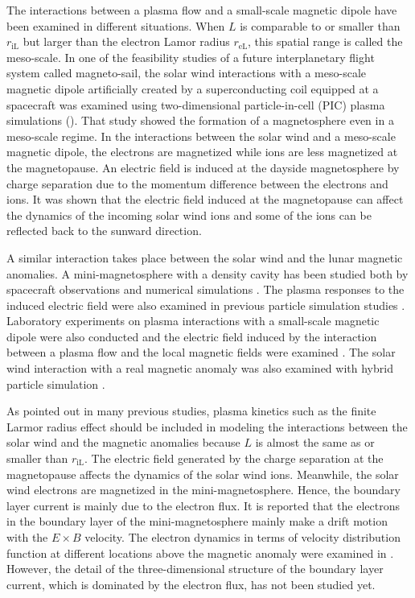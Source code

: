 \documentclass[draft,jgrga]{agutex2015}
\begin{document}
\begin{article}
The interactions between a plasma flow and a small-scale magnetic dipole 
have been examined in different situations.
When $L$ is comparable to or smaller than $r_\mathrm{iL}$
but larger than the electron Lamor radius $r_\mathrm{eL}$,
this spatial range is called the meso-scale.
In one of the feasibility studies of a future interplanetary flight system called magneto-sail,
the solar wind interactions with a meso-scale magnetic dipole artificially created by a
superconducting coil equipped at a spacecraft was examined using two-dimensional
particle-in-cell (PIC) plasma simulations (\cite{Moritaka2012}).
That study showed the formation of a magnetosphere even in a meso-scale regime.
In the interactions between the solar wind and a meso-scale magnetic dipole,
the electrons are magnetized while ions are less magnetized at the magnetopause.
An electric field is induced at the dayside magnetosphere by charge separation
due to the momentum difference between the electrons and ions.
It was shown that the electric field induced at the magnetopause
can affect the dynamics of the incoming solar wind ions and some of the ions can be reflected
back to the sunward direction.

A similar interaction takes place between the solar wind and the lunar magnetic anomalies.
A mini-magnetosphere with a density cavity has been studied both by
 spacecraft observations and numerical simulations
\citep[e.g.][]{Harnett2000,Harnett2003,Halekas2008b,Bamford2012}.
The plasma responses to the induced electric field were also examined
in  previous particle simulation studies
\citep[e.g.][]{Harnett2002,Kallio2012,Poppe2012a,Deca2014,Deca2015}.
Laboratory experiments on plasma interactions
with a small-scale magnetic dipole
were also conducted and the electric field 
induced by the interaction
between a plasma flow and the local magnetic fields were examined
\citep[e.g.][]{Howes2015,Jarvinen2014,Wang2013,Bamford2012}.
The solar wind interaction with a real magnetic anomaly was also 
examined with hybrid particle simulation 
\citep{Fatemi2015}.


As pointed out in many previous studies,
plasma kinetics such as the  finite Larmor radius effect should be included in modeling
the interactions between the solar wind and the magnetic anomalies
because $L$ is almost the same as or smaller than $r_\mathrm{iL}$.
The electric field generated by
the charge separation  at the magnetopause affects 
the dynamics of the solar wind ions. %
Meanwhile, the solar wind electrons are  magnetized in the mini-magnetosphere.
Hence, the boundary layer current is mainly due to the electron flux.
It is reported that the electrons in the boundary layer of the mini-magnetosphere 
mainly make a drift motion with the $E \times B$ velocity.
The electron dynamics in terms of velocity distribution function at different locations above
the magnetic anomaly were examined in \cite{Deca2015}.
However, the detail of the three-dimensional structure of the boundary layer current,
which is  dominated by the electron flux, has not been studied yet.


\end{article}
\end{document}
